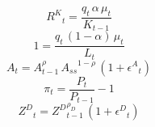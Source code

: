 \noindent[name= `Capital Demand']
\begin{dmath}
{R^K}_{t}=\frac{{q}_{t}\, {\alpha}\, {\mu}_{t}}{{K}_{t-1}}
\end{dmath}
\noindent[name= `Labor Demand']
\begin{dmath}
1=\frac{{q}_{t}\, \left(1-{\alpha}\right)\, {\mu}_{t}}{{L}_{t}}
\end{dmath}
\noindent[name= `TFP shock']
\begin{dmath}
{A}_{t}={A}_{t-1}^{{\rho}}\, {A_{ss}}^{1-{\rho}}\, \left(1+{\epsilon^A}_{t}\right)
\end{dmath}
\noindent[name= `inflation']
\begin{dmath}
{\pi}_{t}=\frac{{P}_{t}}{{P}_{t-1}}-1
\end{dmath}
\noindent[name= `Demand shock']
\begin{dmath}
{Z^D}_{t}={Z^D}_{t-1}^{{\rho_D}}\, \left(1+{\epsilon^D}_{t}\right)
\end{dmath}
